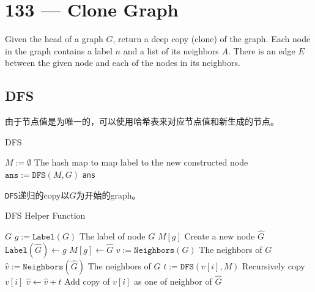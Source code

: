 \section{133 --- Clone Graph}
Given the head of a graph $G$, return a deep copy (clone) of the graph. Each node in the graph contains a label $n$ and a list of its neighbors $A$. There is an edge $E$ between the given node and each of the nodes in its neighbors.
\subsection{DFS}
由于节点值是为唯一的，可以使用哈希表来对应节点值和新生成的节点。
\setcounter{algorithm}{0}
\begin{algorithm}[H]
\caption{DFS}
\begin{algorithmic}[1]
\State $M:=\emptyset$ \Comment The hash map to map label to the new constructed node
\State $\texttt{ans}:=\texttt{DFS}(M, G)$
\State \Return \texttt{ans}
\EndProcedure
\end{algorithmic}
\end{algorithm}
\texttt{DFS}递归的copy以$G$为开始的graph。
\begin{algorithm}[H]
\caption{DFS Helper Function}
\begin{algorithmic}[1]
\State \Return $G$
\EndIf
\State $g:=\texttt{Label}(G)$ \Comment The label of node $G$
\State \Return $M[g]$
\EndIf
\State Create a new node $\hat{G}$
\State $\texttt{Label}(\hat{G})\gets g$
\State $M[g]\gets \hat{G}$
\State $v:=\texttt{Neighbors}(G)$ \Comment The neighbors of $G$
\State $\hat{v}:=\texttt{Neighbors}(\hat{G})$ \Comment The neighbors of $\hat{G}$
\State $t:=\texttt{DFS}(v[i], M)$ \Comment Recursively copy $v[i]$
\State $\hat{v}\gets \hat{v} + t$ \Comment Add copy of $v[i]$ as one of neighbor of $\hat{G}$
\end{algorithmic}
\end{algorithm}
\begin{algorithm}[H]
\begin{algorithmic}[1]
\EndFor
\EndFunction
\end{algorithmic}
\end{algorithm}
